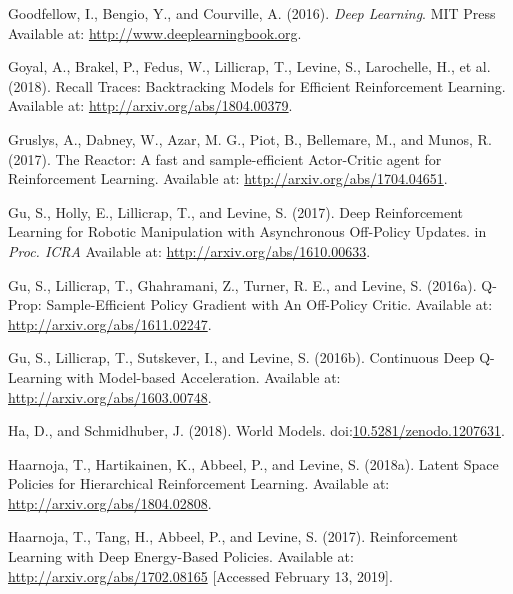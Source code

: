 \documentclass[
  letterpaper,
  DIV=11,
  numbers=noendperiod]{scrreprt}
\newlength{\cslhangindent}
\newlength{\cslentryspacingunit} %
\newenvironment{CSLReferences}[2] %
 {%
  \setlength{\parindent}{0pt}
  \ifodd #1
  \let\oldpar\par
  \def\par{\hangindent=\cslhangindent\oldpar}
  \fi
  \setlength{\parskip}{#2\cslentryspacingunit}
 }%
 {}
\begin{document}
\begin{CSLReferences}{1}{0}
\leavevmode{}%
Goodfellow, I., Bengio, Y., and Courville, A. (2016). \emph{Deep
{Learning}}. {MIT Press} Available at:
\url{http://www.deeplearningbook.org}.

\leavevmode{}%
Goyal, A., Brakel, P., Fedus, W., Lillicrap, T., Levine, S., Larochelle,
H., et al. (2018). Recall {Traces}: {Backtracking Models} for {Efficient
Reinforcement Learning}. Available at:
\url{http://arxiv.org/abs/1804.00379}.

\leavevmode{}%
Gruslys, A., Dabney, W., Azar, M. G., Piot, B., Bellemare, M., and
Munos, R. (2017). The {Reactor}: {A} fast and sample-efficient
{Actor-Critic} agent for {Reinforcement Learning}. Available at:
\url{http://arxiv.org/abs/1704.04651}.

\leavevmode{}%
Gu, S., Holly, E., Lillicrap, T., and Levine, S. (2017). Deep
{Reinforcement Learning} for {Robotic Manipulation} with {Asynchronous
Off-Policy Updates}. in \emph{Proc. {ICRA}} Available at:
\url{http://arxiv.org/abs/1610.00633}.

\leavevmode{}%
Gu, S., Lillicrap, T., Ghahramani, Z., Turner, R. E., and Levine, S.
(2016a). Q-{Prop}: {Sample-Efficient Policy Gradient} with {An
Off-Policy Critic}. Available at: \url{http://arxiv.org/abs/1611.02247}.

\leavevmode{}%
Gu, S., Lillicrap, T., Sutskever, I., and Levine, S. (2016b). Continuous
{Deep Q-Learning} with {Model-based Acceleration}. Available at:
\url{http://arxiv.org/abs/1603.00748}.

\leavevmode{}%
Ha, D., and Schmidhuber, J. (2018). World {Models}.
doi:\href{https://doi.org/10.5281/zenodo.1207631}{10.5281/zenodo.1207631}.

\leavevmode{}%
Haarnoja, T., Hartikainen, K., Abbeel, P., and Levine, S. (2018a).
Latent {Space Policies} for {Hierarchical Reinforcement Learning}.
Available at: \url{http://arxiv.org/abs/1804.02808}.

\leavevmode{}%
Haarnoja, T., Tang, H., Abbeel, P., and Levine, S. (2017). Reinforcement
{Learning} with {Deep Energy-Based Policies}. Available at:
\url{http://arxiv.org/abs/1702.08165} {[}Accessed February 13, 2019{]}.


\end{CSLReferences}
\end{document}
